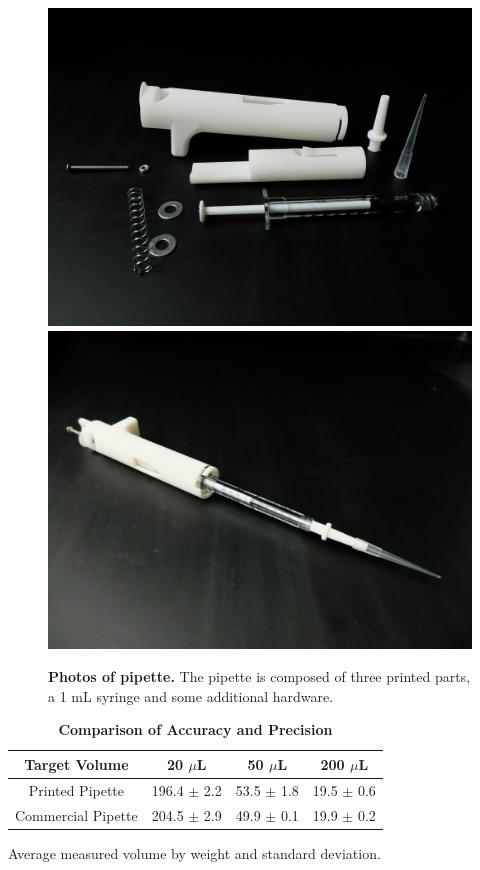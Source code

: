 \documentclass[]{article}
\begin{document}
\begin{figure}
\includegraphics[scale=0.04]{pipette-disassembled.JPG} %
\includegraphics[scale=0.04]{pipette-assembled.JPG} %
\caption{
{\bf Photos of pipette.}  The pipette is composed of three printed parts, a 1 mL syringe and some additional hardware.  
}
\label{photo-parts-figure}
\end{figure}

\begin{table}[!ht]
\caption{
\bf{Comparison of Accuracy and Precision}}
\begin{tabular}{|c|c|c|c|}
\hline
    Target Volume & 20 $\mu$L & 50 $\mu$L & 200 $\mu$L  \\
    \hline
    Printed Pipette & 196.4 $\pm$ 2.2 & 53.5 $\pm$ 1.8 & 19.5 $\pm$ 0.6 \\
    Commercial Pipette & 204.5 $\pm$ 2.9 & 49.9 $\pm$ 0.1 & 19.9 $\pm$ 0.2 \\
    \hline
\end{tabular}
\begin{flushleft} Average measured volume by weight and standard deviation.
\end{flushleft}
\label{tab:comp}
 \end{table}
\end{document}
